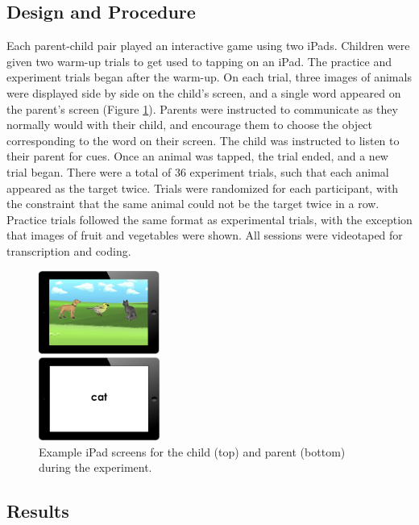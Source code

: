 \documentclass[10pt, letterpaper]{article}
\newenvironment{CodeChunk}{}{}
\begin{document}
\subsection{Design and Procedure}\label{design-and-procedure}

Each parent-child pair played an interactive game using two iPads.
Children were given two warm-up trials to get used to tapping on an
iPad. The practice and experiment trials began after the warm-up. On
each trial, three images of animals were displayed side by side on the
child's screen, and a single word appeared on the parent's screen
(Figure \ref{fig:ipads}). Parents were instructed to communicate as they
normally would with their child, and encourage them to choose the object
corresponding to the word on their screen. The child was instructed to
listen to their parent for cues. Once an animal was tapped, the trial
ended, and a new trial began. There were a total of 36 experiment
trials, such that each animal appeared as the target twice. Trials were
randomized for each participant, with the constraint that the same
animal could not be the target twice in a row. Practice trials followed
the same format as experimental trials, with the exception that images
of fruit and vegetables were shown. All sessions were videotaped for
transcription and coding.

\begin{CodeChunk}
\begin{figure}[tb]

{\centering \includegraphics[width=150px]{figs/ipads} 

}

\caption[Example iPad screens for the child (top) and parent (bottom) during the experiment]{Example iPad screens for the child (top) and parent (bottom) during the experiment.}\label{fig:ipads}
\end{figure}
\end{CodeChunk}

\subsection{Results}\label{results}
\end{document}
